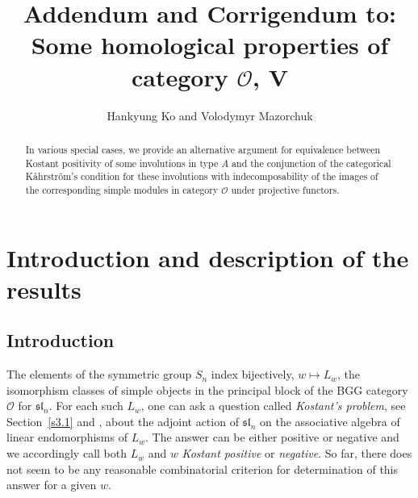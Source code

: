 \documentclass[a4paper]{amsart}
\begin{document}
\title[Addendum to: Some homological 
properties of category $\mathcal{O}$, V]
{Addendum and Corrigendum to: \\Some homological 
properties of category $\mathcal{O}$, V}

\author[Hankyung Ko and Volodymyr Mazorchuk]
{Hankyung Ko and Volodymyr Mazorchuk}

\begin{abstract}
In various special cases, we provide an alternative argument for 
equivalence between Kostant positivity of some involutions in type $A$
and the conjunction of the categorical K{\aa}hrstr{\"o}m's condition
for these involutions with indecomposability of the images of the 
corresponding simple modules in category $\mathcal{O}$ under projective functors.
\end{abstract}

\maketitle


\section{Introduction and description of the results}\label{s1}

\subsection{Introduction}\label{s1.1}

The elements of the symmetric group $S_n$ index bijectively, $w\mapsto L_w$, 
the isomorphism classes of simple objects in 
the principal block of the BGG category $\mathcal{O}$ 
for $\mathfrak{sl}_n$. For each such $L_w$, one can ask a question
called {\em Kostant's problem}, see Section~\ref{s3.1} and \cite{Jo}, about the adjoint action of 
$\mathfrak{sl}_n$ on the associative algebra of linear endomorphisms of
$L_w$. The answer can be either positive or negative and we accordingly call
both $L_w$ and 
$w$ {\em Kostant positive} or {\em negative}. So far, there does not seem to be
any reasonable combinatorial criterion for determination of this answer for
a given $w$.
\end{document}
